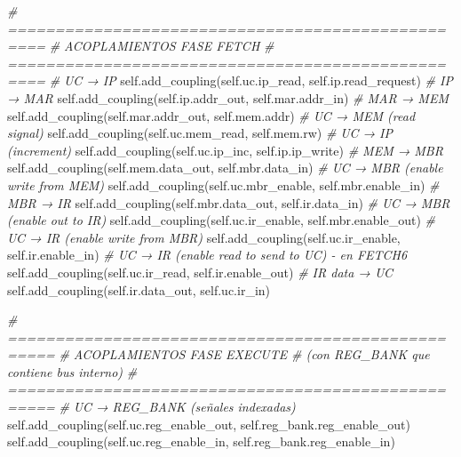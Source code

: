 \documentclass[12pt,oneside]{templates/unerthesis}
\newenvironment{Shaded}{\begin{snugshade}}{\end{snugshade}}
\newcommand{\CommentTok}[1]{\textcolor[rgb]{0.56,0.35,0.01}{\textit{#1}}}
\newcommand{\NormalTok}[1]{#1}
\newcommand{\VariableTok}[1]{\textcolor[rgb]{0.00,0.00,0.00}{#1}}
\begin{document}
\begin{Shaded}
\begin{Highlighting}[]
        \CommentTok{\# ==================================================}
        \CommentTok{\# ACOPLAMIENTOS FASE FETCH}
        \CommentTok{\# ==================================================}
        \CommentTok{\# UC → IP}
        \VariableTok{self}\NormalTok{.add\_coupling(}\VariableTok{self}\NormalTok{.uc.ip\_read, }\VariableTok{self}\NormalTok{.ip.read\_request)}
        \CommentTok{\# IP → MAR}
        \VariableTok{self}\NormalTok{.add\_coupling(}\VariableTok{self}\NormalTok{.ip.addr\_out, }\VariableTok{self}\NormalTok{.mar.addr\_in)}
        \CommentTok{\# MAR → MEM}
        \VariableTok{self}\NormalTok{.add\_coupling(}\VariableTok{self}\NormalTok{.mar.addr\_out, }\VariableTok{self}\NormalTok{.mem.addr)}
        \CommentTok{\# UC → MEM (read signal)}
        \VariableTok{self}\NormalTok{.add\_coupling(}\VariableTok{self}\NormalTok{.uc.mem\_read, }\VariableTok{self}\NormalTok{.mem.rw)}
        \CommentTok{\# UC → IP (increment)}
        \VariableTok{self}\NormalTok{.add\_coupling(}\VariableTok{self}\NormalTok{.uc.ip\_inc, }\VariableTok{self}\NormalTok{.ip.ip\_write)}
        \CommentTok{\# MEM → MBR}
        \VariableTok{self}\NormalTok{.add\_coupling(}\VariableTok{self}\NormalTok{.mem.data\_out, }\VariableTok{self}\NormalTok{.mbr.data\_in)}
        \CommentTok{\# UC → MBR (enable write from MEM)}
        \VariableTok{self}\NormalTok{.add\_coupling(}\VariableTok{self}\NormalTok{.uc.mbr\_enable, }\VariableTok{self}\NormalTok{.mbr.enable\_in)}
        \CommentTok{\# MBR → IR}
        \VariableTok{self}\NormalTok{.add\_coupling(}\VariableTok{self}\NormalTok{.mbr.data\_out, }\VariableTok{self}\NormalTok{.ir.data\_in)}
        \CommentTok{\# UC → MBR (enable out to IR)}
        \VariableTok{self}\NormalTok{.add\_coupling(}\VariableTok{self}\NormalTok{.uc.ir\_enable, }\VariableTok{self}\NormalTok{.mbr.enable\_out)}
        \CommentTok{\# UC → IR (enable write from MBR)}
        \VariableTok{self}\NormalTok{.add\_coupling(}\VariableTok{self}\NormalTok{.uc.ir\_enable, }\VariableTok{self}\NormalTok{.ir.enable\_in)}
        \CommentTok{\# UC → IR (enable read to send to UC) {-} en FETCH6}
        \VariableTok{self}\NormalTok{.add\_coupling(}\VariableTok{self}\NormalTok{.uc.ir\_read, }\VariableTok{self}\NormalTok{.ir.enable\_out)}
        \CommentTok{\# IR data → UC}
        \VariableTok{self}\NormalTok{.add\_coupling(}\VariableTok{self}\NormalTok{.ir.data\_out, }\VariableTok{self}\NormalTok{.uc.ir\_in)}
        
        \CommentTok{\# ===================================================}
        \CommentTok{\# ACOPLAMIENTOS FASE EXECUTE }
        \CommentTok{\# (con REG\_BANK que contiene bus interno)}
        \CommentTok{\# ===================================================}
        \CommentTok{\# UC → REG\_BANK (señales indexadas)}
        \VariableTok{self}\NormalTok{.add\_coupling(}\VariableTok{self}\NormalTok{.uc.reg\_enable\_out, }
        \VariableTok{self}\NormalTok{.reg\_bank.reg\_enable\_out)}
        \VariableTok{self}\NormalTok{.add\_coupling(}\VariableTok{self}\NormalTok{.uc.reg\_enable\_in, }
        \VariableTok{self}\NormalTok{.reg\_bank.reg\_enable\_in)}



\end{Highlighting}
\end{Shaded}
\end{document}
